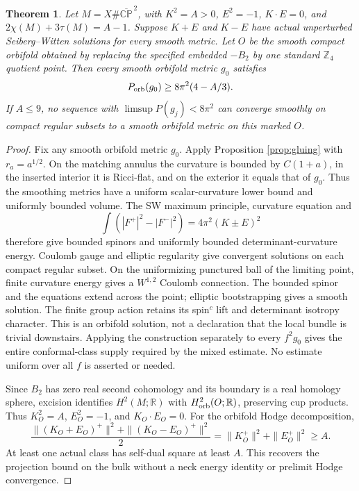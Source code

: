 \documentclass[11pt]{article}
\newtheorem{theorem}{Theorem}[section]
\newcommand{\CP}{\mathbb{CP}}
\begin{document}
\begin{theorem}\label{thm:orbifold}
Let $M=X\#\overline{\CP}^{\,2}$, with $K^2=A>0$, $E^2=-1$, $K\cdot E=0$, and $2\chi(M)+3\tau(M)=A-1$. Suppose $K+E$ and $K-E$ have actual unperturbed Seiberg--Witten solutions for every smooth metric. Let $O$ be the smooth compact orbifold obtained by replacing the specified embedded $-B_2$ by one standard $\mathbb Z_4$ quotient point. Then every smooth orbifold metric $g_0$ satisfies
\begin{equation}\label{eq:A9}
 P_{\rm orb}(g_0)\ge8\pi^2(4-A/3).
\end{equation}
If $A\le9$, no sequence with $\limsup P(g_j)<8\pi^2$ can converge smoothly on compact regular subsets to a smooth orbifold metric on this marked $O$.
\end{theorem}
\begin{proof}
Fix any smooth orbifold metric $g_0$. Apply Proposition \ref{prop:gluing} with $r_a=a^{1/2}$. On the matching annulus the curvature is bounded by $C(1+a)$, in the inserted interior it is Ricci-flat, and on the exterior it equals that of $g_0$. Thus the smoothing metrics have a uniform scalar-curvature lower bound and uniformly bounded volume. The SW maximum principle, curvature equation and
\[
 \int(|F^+|^2-|F^-|^2)=4\pi^2(K\pm E)^2
\]
therefore give bounded spinors and uniformly bounded determinant-curvature energy. Coulomb gauge and elliptic regularity give convergent solutions on each compact regular subset. On the uniformizing punctured ball of the limiting point, finite curvature energy gives a $W^{1,2}$ Coulomb connection. The bounded spinor and the equations extend across the point; elliptic bootstrapping gives a smooth solution. The finite group action retains its spin$^c$ lift and determinant isotropy character. This is an orbifold solution, not a declaration that the local bundle is trivial downstairs. Applying the construction separately to every $f^2g_0$ gives the entire conformal-class supply required by the mixed estimate. No estimate uniform over all $f$ is asserted or needed.

Since $B_2$ has zero real second cohomology and its boundary is a real homology sphere, excision identifies $H^2(M;\mathbb R)$ with $H^2_{\rm orb}(O;\mathbb R)$, preserving cup products. Thus $K_O^2=A$, $E_O^2=-1$, and $K_O\cdot E_O=0$. For the orbifold Hodge decomposition,
\[
 \frac{\|(K_O+E_O)^+\|^2+\|(K_O-E_O)^+\|^2}{2}
 =\|K_O^+\|^2+\|E_O^+\|^2\ge A.
\]
At least one actual class has self-dual square at least $A$. This recovers the projection bound on the bulk without a neck energy identity or prelimit Hodge convergence.


\end{proof}
\end{document}
